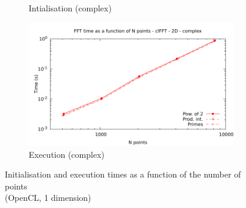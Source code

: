 \documentclass[12pt, a4paper]{article}
\begin{document}
\begin{figure}[H]
\begin{subfigure}{.5\textwidth}
\caption{Intialisation (complex)}
\label{FFTCL2DCI}
\end{subfigure}%
\begin{subfigure}{.5\textwidth}
\centering
\includegraphics[width=.9\linewidth]{graphs/fft-opencl-2d-pow2-c-exec.pdf}
\caption{Execution (complex)}
\label{FFTCL2DCE}
\end{subfigure}
\caption{Initialisation and execution times as a function of the number of points\\(OpenCL, 1 dimension)}
\label{FFTCL2D}
\end{figure}
\end{document}

